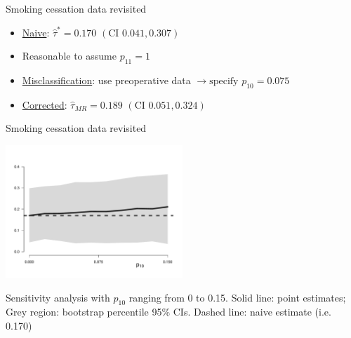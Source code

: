 \documentclass[12pt,aspectratio=169]{beamer}
\begin{document}
\begin{frame}{Smoking cessation data revisited}

 \begin{itemize}

\item

\underline{{\color{blue}Naive}}: $\hat\tau^\ast=0.170\,\, (\text{CI}\,\, 0.041, 0.307)$

\bigskip

\item Reasonable to assume $p_{11}=1$

\item

\underline{{\color{blue}Misclassification}}: use {\color{dakglee}preoperative} data $\rightarrow \text{specify}\,\,  p_{10}=0.075$





\item

\underline{{\color{blue}Corrected}}:
$\hat\tau_{MR}=0.189\,\, (\text{CI}\,\, 0.051, 0.324)$

\end{itemize}

\end{frame}



\begin{frame}{Smoking cessation data revisited}

    \begin{center}
     \includegraphics[width=0.5\textwidth]{MRplot.pdf}
     \end{center}
 
{\small Sensitivity analysis with $p_{10}$ ranging from 0 to 0.15. Solid line: point estimates; Grey region:  bootstrap percentile 95\% CIs. Dashed line: naive estimate (i.e. 0.170)}
\end{frame}
\end{document}
